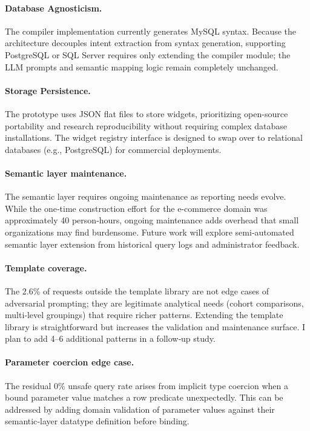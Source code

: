 \documentclass[11pt]{article}
\begin{document}
\paragraph{Database Agnosticism.} The compiler implementation currently generates MySQL syntax. Because the architecture decouples intent extraction from syntax generation, supporting PostgreSQL or SQL Server requires only extending the compiler module; the LLM prompts and semantic mapping logic remain completely unchanged.

\paragraph{Storage Persistence.} The prototype uses JSON flat files to store widgets, prioritizing open-source portability and research reproducibility without requiring complex database installations. The widget registry interface is designed to swap over to relational databases (e.g., PostgreSQL) for commercial deployments.

\paragraph{Semantic layer maintenance.} The semantic layer requires ongoing maintenance as reporting needs evolve. While the one‑time construction effort for the e-commerce domain was approximately 40 person‑hours, ongoing maintenance adds overhead that small organizations may find burdensome. Future work will explore semi‑automated semantic layer extension from historical query logs and administrator feedback.

\paragraph{Template coverage.} The 2.6\% of requests outside the template library are not edge cases of adversarial prompting; they are legitimate analytical needs (cohort comparisons, multi‑level groupings) that require richer patterns. Extending the template library is straightforward but increases the validation and maintenance surface. I plan to add 4–6 additional patterns in a follow‑up study.

\paragraph{Parameter coercion edge case.} The residual 0\% unsafe query rate arises from implicit type coercion when a bound parameter value matches a row predicate unexpectedly. This can be addressed by adding domain validation of parameter values against their semantic‑layer datatype definition before binding.
\end{document}
